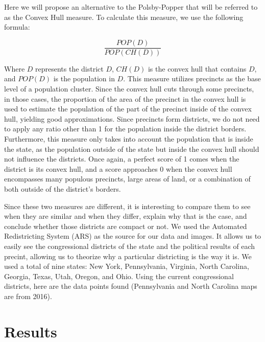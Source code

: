 \documentclass[letterpaper]{article}
\begin{document}
Here we will propose an alternative to the Polsby-Popper that will be referred to as the Convex Hull measure. To calculate this measure, we use the following formula:

\[
	\frac{POP(D)}{POP(CH(D))}
\]

Where $D$ represents the district $D$, $CH(D)$ is the convex hull that contains $D$, and $POP(D)$ is the population in $D$. This measure utilizes precincts as the base level of a population cluster. Since the convex hull cuts through some precincts, in those cases, the proportion of the area of the precinct in the convex hull is used to estimate the population of the part of the precinct inside of the convex hull, yielding good approximations. Since precincts form districts, we do not need to apply any ratio other than 1 for the population inside the district borders. Furthermore, this measure only takes into account the population that is inside the state, as the population outside of the state but inside the convex hull should not influence the districts. Once again, a perfect score of 1 comes when the district is its convex hull, and a score approaches 0 when the convex hull encompasses many populous precincts, large areas of land, or a combination of both outside of the district's borders.


Since these two measures are different, it is interesting to compare them to see when they are similar and when they differ, explain why that is the case, and conclude whether those districts are compact or not. We used the Automated Redistricting System (ARS) as the source for our data and images. It allows us to easily see the congressional districts of the state and the political results of each precint, allowing us to theorize why a particular districting is the way it is. We used a total of nine states: New York, Pennsylvania, Virginia, North Carolina, Georgia, Texas, Utah, Oregon, and Ohio. Using the current congressional districts, here are the data points found (Pennsylvania and North Carolina maps are from 2016).

\section{Results}
\end{document}
